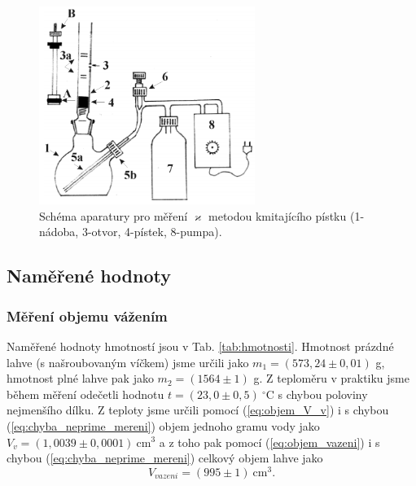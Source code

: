 \documentclass[english]{article}
\newcommand{\unit}[1]{\mathrm{#1}}
\begin{document}
\begin{figure}[h!]
\begin{minipage}{.55\textwidth}
\begin{minipage}{.90\textwidth}
			  \centering
							\includegraphics[width=7cm]{att/aparatura3.png}
							\caption{Schéma aparatury pro měření $\varkappa$ metodou kmitajícího pístku (1-nádoba, 3-otvor, 4-pístek, 8-pumpa).  \cite{bib:zadani3}}
							\label{fig:aparatura3}
			\end{minipage}
	\end{minipage}
	\end{figure}					
	\subsection{Naměřené hodnoty}
			\subsubsection{Měření objemu vážením}
				   Naměřené hodnoty hmotností jsou v Tab. \ref{tab:hmotnosti}. Hmotnost prázdné lahve (s našroubovaným víčkem) jsme určili jako $m_1 = (573,24 \pm 0,01)$ g, hmotnost plné lahve pak jako $m_2 = (1564 \pm 1)$ g. Z teploměru v praktiku jsme během měření odečetli hodnotu $t = (23,0\pm0,5) \unit{\ ^\circ C}$ s chybou poloviny nejmenšího dílku. Z teploty jsme určili pomocí (\ref{eq:objem_V_v}) i s chybou (\ref{eq:chyba_neprime_mereni}) objem jednoho gramu vody jako  $V_v = (1,0039\pm0,0001)\unit{\ cm^3}$ a z toho pak  pomocí (\ref{eq:objem_vazeni}) i s chybou (\ref{eq:chyba_neprime_mereni}) celkový objem lahve jako 
				   \begin{equation}
				   		V_{vazeni} = (995\pm1)\unit{\ cm^3}.
				   \end{equation}
\end{document}
